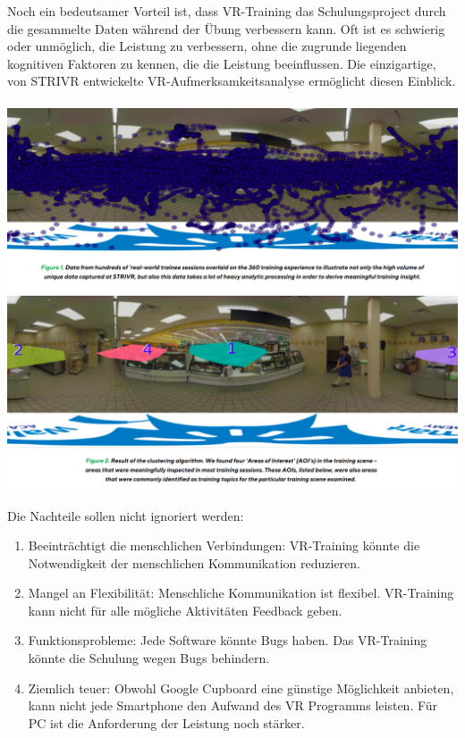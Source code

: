 Noch ein bedeutsamer Vorteil ist, dass VR-Training das Schulungsproject durch die gesammelte Daten während der Übung verbessern kann. \glqq Oft ist es schwierig oder unmöglich, die Leistung zu verbessern, ohne die zugrunde liegenden kognitiven Faktoren zu kennen, die die Leistung beeinflussen. Die einzigartige, von STRIVR entwickelte VR-Aufmerksamkeitsanalyse ermöglicht diesen Einblick. \grqq\ \citep{18}
\includegraphics[width=\textwidth]{images/intentionanalys1.png}
\includegraphics[width=\textwidth]{images/intentionanalys2.png}

Die Nachteile sollen nicht ignoriert werden\citep{17}:

\begin{enumerate}
\item Beeinträchtigt die menschlichen Verbindungen: VR-Training könnte die Notwendigkeit der menschlichen Kommunikation reduzieren.
\item Mangel an Flexibilität: Menschliche Kommunikation ist flexibel. VR-Training kann nicht für alle mögliche Aktivitäten Feedback geben.
\item Funktionsprobleme: Jede Software könnte Bugs haben. Das VR-Training könnte die Schulung wegen Bugs behindern.
\item Ziemlich teuer: Obwohl Google Cupboard eine günstige Möglichkeit anbieten, kann nicht jede Smartphone den Aufwand des VR Programms leisten. Für PC ist die Anforderung der Leistung noch stärker.
\end{enumerate}\

